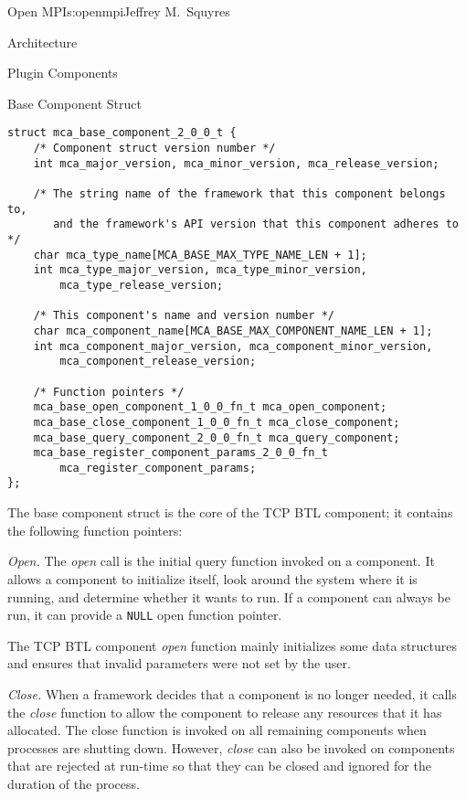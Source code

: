 \begin{aosachapter}{Open MPI}{s:openmpi}{Jeffrey M.\ Squyres}
\begin{aosasect1}{Architecture}
\begin{aosasect2}{Plugin Components}
\begin{aosabox}{Base Component Struct}
\begin{verbatim}
struct mca_base_component_2_0_0_t {
    /* Component struct version number */
    int mca_major_version, mca_minor_version, mca_release_version;

    /* The string name of the framework that this component belongs to,
       and the framework's API version that this component adheres to */
    char mca_type_name[MCA_BASE_MAX_TYPE_NAME_LEN + 1];
    int mca_type_major_version, mca_type_minor_version,  
        mca_type_release_version;

    /* This component's name and version number */
    char mca_component_name[MCA_BASE_MAX_COMPONENT_NAME_LEN + 1];
    int mca_component_major_version, mca_component_minor_version,
        mca_component_release_version;

    /* Function pointers */  
    mca_base_open_component_1_0_0_fn_t mca_open_component;
    mca_base_close_component_1_0_0_fn_t mca_close_component;
    mca_base_query_component_2_0_0_fn_t mca_query_component;
    mca_base_register_component_params_2_0_0_fn_t 
        mca_register_component_params;
};
\end{verbatim}
\end{aosabox}

The base component struct is the core of the TCP BTL component; it
contains the following function pointers:

\begin{aosaitemize}
\item \emph{Open.} The \emph{open} call is the initial query function
  invoked on a component.  It allows a component to initialize itself,
  look around the system where it is running, and determine whether it
  wants to run.  If a component can always be run, it can provide a
  {\tt NULL} open function pointer.

  The TCP BTL component \emph{open} function mainly initializes some
  data structures and ensures that invalid parameters were not set by
  the user.

\item \emph{Close.} When a framework decides that a component is no
  longer needed, it calls the \emph{close} function to allow the
  component to release any resources that it has allocated.  The close
  function is invoked on all remaining components when processes are
  shutting down.  However, \emph{close} can also be invoked on
  components that are rejected at run-time so that they can be closed
  and ignored for the duration of the process.


\end{aosaitemize}
\end{aosasect2}
\end{aosasect1}
\end{aosachapter}
